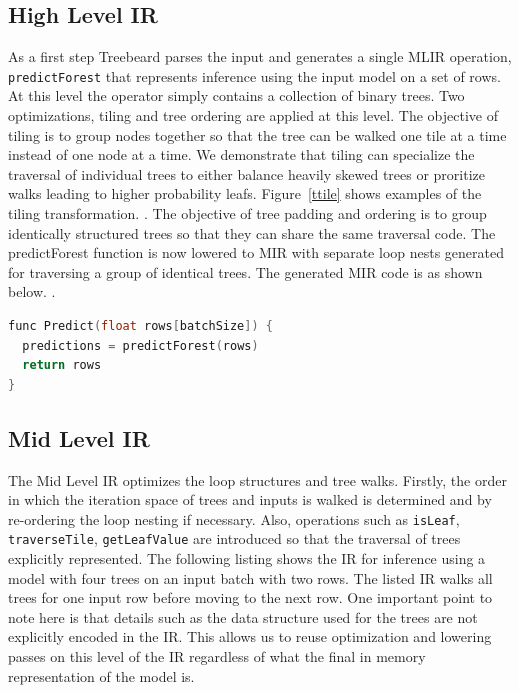 \subsection{High Level IR}
As a first step Treebeard parses the input and generates a single MLIR operation, \texttt{predictForest} that represents inference using the input model on a set of rows. 
At this level the operator simply contains a collection of binary trees. Two optimizations, tiling and tree ordering are applied at this level. The objective of tiling is to group nodes together so that the tree can be walked one tile at a time instead of one node at a time. We demonstrate that tiling can specialize the traversal of individual trees to either balance heavily skewed trees or proritize walks leading to higher probability leafs. Figure~\ref{ttile} shows examples of the tiling transformation. . The objective of tree padding and ordering is to group identically structured trees so that they can share the same traversal code. The predictForest function is now lowered to MIR with separate loop nests generated for traversing a group of identical trees. The generated MIR code is as shown below. 
.



\begin{lstlisting}[language=C++]
func Predict(float rows[batchSize]) {
  predictions = predictForest(rows) 
  return rows
}
\end{lstlisting}

\subsection{Mid Level IR}
The Mid Level IR optimizes the loop structures and tree walks. Firstly, the order in which the iteration space of trees and inputs is walked is determined and by re-ordering the loop nesting if necessary. Also, operations such as \texttt{isLeaf}, \texttt{traverseTile}, \texttt{getLeafValue} are introduced so that the traversal of trees explicitly represented. The following listing shows the IR for inference using a model with four trees on an input batch with two rows. The listed IR walks all trees for one input row before moving to the next row. One important point to note here is that details such as the data structure used for the trees are not explicitly encoded in the IR. This allows us to reuse optimization and lowering passes on this level of the IR regardless of what the final in memory representation of the model is.

